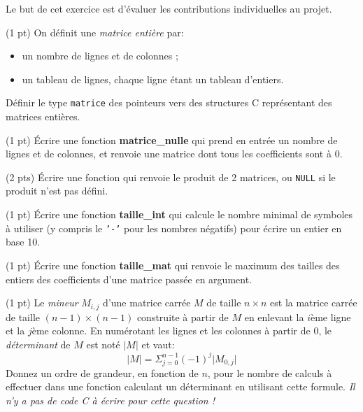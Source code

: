 
Le but de cet exercice est d'{\'e}valuer les contributions individuelles
au projet. 

\question (1 pt) On d{\'e}finit une \emph{matrice enti{\`e}re} par: 
\begin{itemize}
\item un nombre de lignes et de colonnes ;
\item un tableau de lignes, chaque ligne {\'e}tant un tableau d'entiers.
\end{itemize}
D{\'e}finir le type \texttt{matrice} des pointeurs vers des structures C
repr{\'e}sentant des matrices enti{\`e}res.

\question (1 pt) {\'E}crire une fonction \textbf{matrice\_nulle} qui prend
en entr{\'e}e un nombre de lignes et de colonnes, et renvoie une matrice
dont tous les coefficients sont {\`a} $0$.

\question (2 pts) {\'E}crire une fonction qui renvoie le produit de 2
matrices, ou \texttt{NULL} si le produit n'est pas d{\'e}fini.

\question (1 pt) {\'E}crire une fonction \textbf{taille\_int} qui calcule le
nombre minimal de symboles {\`a} utiliser (y compris le \texttt{'-'} pour
les nombres n{\'e}gatifs) pour {\'e}crire un entier en base 10.

\question (1 pt) {\'E}crire une fonction \textbf{taille\_mat} qui renvoie
le maximum des tailles des entiers des coefficients d'une matrice
pass{\'e}e en argument.

\question (1 pt) Le \emph{mineur} $M_{i,j}$ d'une matrice carr{\'e}e $M$
de taille $n\times n$ est la matrice carr{\'e}e de taille $(n-1)\times
(n-1)$ construite {\`a} partir de $M$ en enlevant la $i${\`e}me ligne et la
$j${\`e}me colonne. En num{\'e}rotant les lignes et les colonnes {\`a} partir de
$0$, le \emph{d{\'e}terminant} de $M$ est not{\'e} $\vert M\vert$ et vaut:
$$
\vert M\vert = \Sigma_{j=0}^{n-1} (-1)^j \vert M_{0,j}\vert
$$
Donnez un ordre de grandeur, en fonction de $n$, pour le nombre de
calculs {\`a} effectuer dans une fonction calculant un d{\'e}terminant en
utilisant cette formule. \textit{Il n'y a pas de code C {\`a} {\'e}crire pour
  cette question !}

